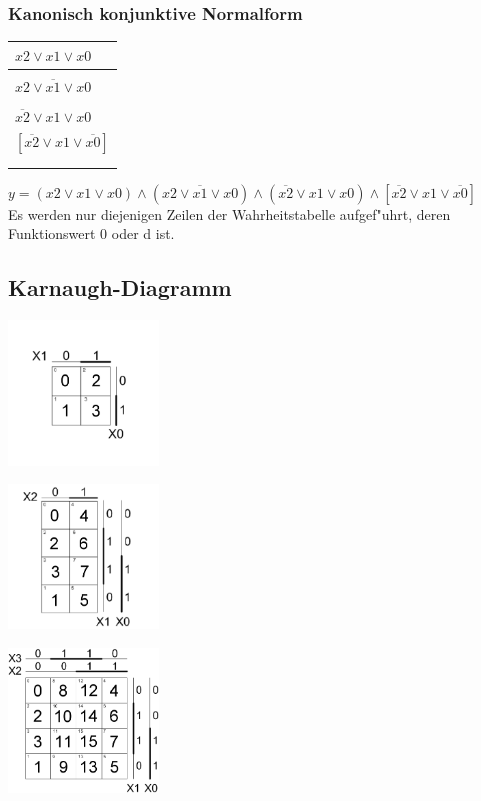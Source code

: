 \begin{multicols}{3}
		\subsubsection{Kanonisch konjunktive Normalform}
			\begin{tabular}{|l|}
				\hline
					$x2 \vee x1 \vee x0$ \\
				\hline
				\\
				\hline
					$x2 \vee \overline{x1} \vee x0$ \\
				\hline
				\\
				\hline
					$\overline{x2} \vee x1 \vee x0$ \\
				\hline
					$[\overline{x2} \vee x1 \vee \overline{x0}]$ \\
				\hline
				\\
				\hline
				\\
				\hline	
			\end{tabular}
			$y=(x2 \vee x1 \vee x0) \wedge (x2 \vee \overline{x1} \vee x0) \wedge (\overline{x2} \vee x1 \vee x0) \wedge [\overline{x2} \vee x1 \vee \overline{x0}]$ \\
			Es werden nur diejenigen Zeilen der Wahrheitstabelle aufgef"uhrt, deren Funktionswert 0 oder d ist.
	\end{multicols}

\subsection{Karnaugh-Diagramm}
	\begin{multicols}{3}
		\includegraphics[width=0.3\textwidth]{pics/kv/2erKV} 
	\columnbreak
	
		\includegraphics[width=0.3\textwidth]{pics/kv/3erKV}
	\columnbreak
	
		\includegraphics[width=0.3\textwidth]{pics/kv/4erKV}
	\end{multicols}
	

